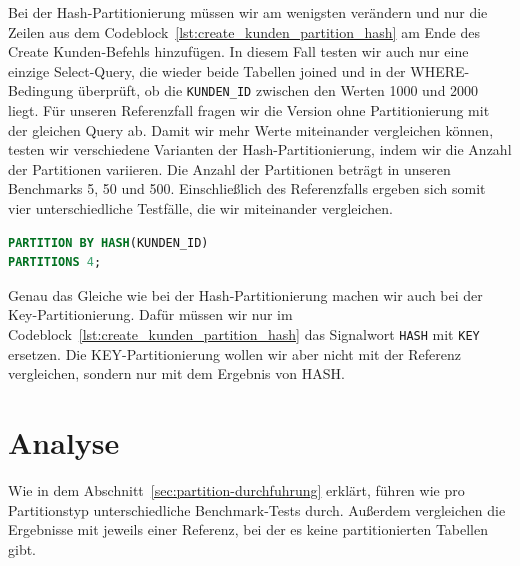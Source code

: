 Bei der Hash-Partitionierung müssen wir am wenigsten verändern und nur die Zeilen aus dem Codeblock~\ref{lst:create_kunden_partition_hash} am Ende des Create Kunden-Befehls hinzufügen.
In diesem Fall testen wir auch nur eine einzige Select-Query, die wieder beide Tabellen joined und in der WHERE-Bedingung überprüft, ob die \texttt{KUNDEN\_ID} zwischen den Werten 1000 und 2000 liegt.
Für unseren Referenzfall fragen wir die Version ohne Partitionierung mit der gleichen Query ab.
Damit wir mehr Werte miteinander vergleichen können, testen wir verschiedene Varianten der Hash-Partitionierung, indem wir die Anzahl der Partitionen variieren.
Die Anzahl der Partitionen beträgt in unseren Benchmarks 5, 50 und 500.
Einschließlich des Referenzfalls ergeben sich somit vier unterschiedliche Testfälle, die wir miteinander vergleichen.

\vspace{-5pt}
\begin{lstlisting}[language=SQL,caption=Hash-Partitonierung,label={lst:create_kunden_partition_hash}]
PARTITION BY HASH(KUNDEN_ID)
PARTITIONS 4;
\end{lstlisting}
\vspace{-5pt}

Genau das Gleiche wie bei der Hash-Partitionierung machen wir auch bei der Key-Partitionierung.
Dafür müssen wir nur im Codeblock~\ref{lst:create_kunden_partition_hash} das Signalwort \texttt{HASH} mit \texttt{KEY} ersetzen.
Die KEY-Partitionierung wollen wir aber nicht mit der Referenz vergleichen, sondern nur mit dem Ergebnis von HASH\@.

\section{Analyse}\label{sec:partition-analyse}
Wie in dem Abschnitt~\ref{sec:partition-durchfuhrung} erklärt, führen wie pro Partitionstyp unterschiedliche Benchmark-Tests durch.
Außerdem vergleichen die Ergebnisse mit jeweils einer Referenz, bei der es keine partitionierten Tabellen gibt.

